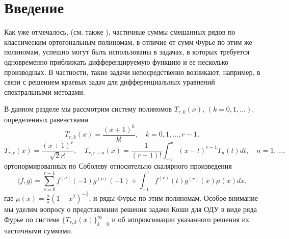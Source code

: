 \section{Введение}

Как уже отмечалось, (см. также \cite{Shar11, Shar12, Shar13, Shar14, Shar2006, Shar2008, Shar2003, Shar18}), частичные суммы смешанных рядов по классическим ортогональным полиномам, в отличие от сумм Фурье по этим же полиномам, успешно могут быть использованы в задачах, в которых требуется одновременно приближать дифференцируемую функцию и ее несколько производных. В частности, такие задачи непосредственно возникают, например, в связи с решением краевых задач для дифференциальных уравнений спектральными методами.

В данном разделе мы рассмотрим систему полиномов $T_{r,k}(x)$,  $(k=0,1,\ldots)$, определенных равенствами
\begin{equation}\label{du2018cheb-1.4}
T_{r,k}(x) =\frac{(x+1)^k}{k!}, \quad k=0,1,\ldots, r-1,
\end{equation}
\begin{equation}\label{du2018cheb-1.5}
T_{r,r}(x) =\frac{(x+1)^r}{\sqrt{2}r!},\quad T_{r,r+n}(x) =\frac{1}{(r-1)!}\int_{-1}^x(x-t)^{r-1}T_{n}(t)dt, \quad n=1,\ldots,
\end{equation}
ортонормированных по Соболеву относительно скалярного произведения
\begin{equation}\label{du2018cheb-1.3}
\langle f,g\rangle=\sum_{\nu=0}^{r-1}f^{(\nu)}(-1)g^{(\nu)}(-1)+\int_{-1}^{1}f^{(r)}(t)g^{(r)}(x)\mu(x)dx,
\end{equation}
где $\mu(x)=\frac2\pi(1-x^2)^{-\frac12}$, и ряды Фурье по этим полиномам. Особое внимание мы уделим вопросу о представлении  решения задачи Коши для ОДУ  в виде ряда Фурье по системе $\{T_{r,k}(x)\}_{k=0}^\infty$  и об аппроксимации указанного решения их частичными суммами.

